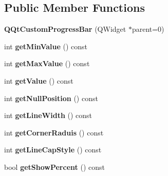 \subsection*{Public Member Functions}
\begin{DoxyCompactItemize}
\item 
\mbox{\label{class_q_qt_custom_progress_bar_a0ed2ec1d48eed30e7a555ad98d0749c8}} 
{\bfseries Q\+Qt\+Custom\+Progress\+Bar} (Q\+Widget $\ast$parent=0)
\item 
\mbox{\label{class_q_qt_custom_progress_bar_aeb97fd564064e6f32c589968f64ff35b}} 
int {\bfseries get\+Min\+Value} () const
\item 
\mbox{\label{class_q_qt_custom_progress_bar_a2a1b438e0679c849c75569de17c4fa0f}} 
int {\bfseries get\+Max\+Value} () const
\item 
\mbox{\label{class_q_qt_custom_progress_bar_a69536080922fa60728bd515209b24516}} 
int {\bfseries get\+Value} () const
\item 
\mbox{\label{class_q_qt_custom_progress_bar_a4d25c17bf255da174de4bdf88b0935fc}} 
int {\bfseries get\+Null\+Position} () const
\item 
\mbox{\label{class_q_qt_custom_progress_bar_a81edaf786842f8b04dc3ba6a3900906a}} 
int {\bfseries get\+Line\+Width} () const
\item 
\mbox{\label{class_q_qt_custom_progress_bar_a077a3b5d33c54cef3f33e6214596274d}} 
int {\bfseries get\+Corner\+Raduis} () const
\item 
\mbox{\label{class_q_qt_custom_progress_bar_abbf5a8716baf9a22edbcc4efba617c54}} 
int {\bfseries get\+Line\+Cap\+Style} () const
\item 
\mbox{\label{class_q_qt_custom_progress_bar_ab9ad952c38ddd15d5b044bb8c59b9760}} 
bool {\bfseries get\+Show\+Percent} () const
\item 
\mbox{\label{class_q_qt_custom_progress_bar_a78dab16ee66a17f652f4fa5da1c0fccd}} 

\end{DoxyCompactItemize}
